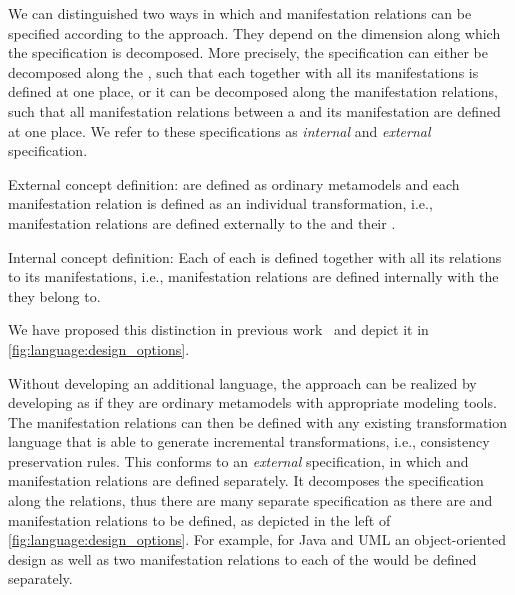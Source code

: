 We can distinguished two ways in which \conceptmetamodels and manifestation relations can be specified according to the \commonalities approach.
They depend on the dimension along which the specification is decomposed.
More precisely, the specification can either be decomposed along the \commonalities, such that each \commonalities together with all its manifestations is defined at one place, or it can be decomposed along the manifestation relations, such that all manifestation relations between a \conceptmetamodel and its manifestation are defined at one place.
We refer to these specifications as \emph{internal} and \emph{external} specification.
\begin{properdescription}
    \item[External concept definition:] \Conceptmetamodels are defined as ordinary metamodels and each manifestation relation is defined as an individual transformation, i.e., manifestation relations are defined externally to the \conceptmetamodels and their \commonalities.
    \item[Internal concept definition:] Each \commonality of each \conceptmetamodel is defined together with all its relations to its manifestations, i.e., manifestation relations are defined internally with the \commonalities they belong to.
\end{properdescription}
We have proposed this distinction in previous work~\cite{klare2019models} and depict it in \autoref{fig:language:design_options}.

Without developing an additional language, the \commonalities approach can be realized by developing \conceptmetamodels as if they are ordinary metamodels with appropriate modeling tools.
The manifestation relations can then be defined with any existing transformation language that is able to generate incremental transformations, i.e., consistency preservation rules.
This conforms to an \emph{external} specification, in which \conceptmetamodels and manifestation relations are defined separately.
It decomposes the specification along the relations, thus there are many separate specification as there are \conceptmetamodels and manifestation relations to be defined, as depicted in the left of \autoref{fig:language:design_options}.
For example, for Java and \gls{UML} an object-oriented design \conceptmetamodel as well as two manifestation relations to each of the \concretemetamodels would be defined separately.

